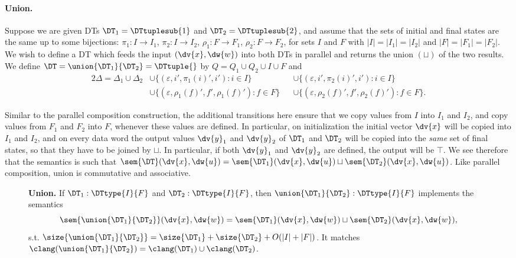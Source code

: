 \paragraph*{Union.}
Suppose we are given DTs $\DT_1 = \DTtuplesub{1}$ and $\DT_2 = \DTtuplesub{2}$, and assume that the sets of initial and final states are the same up to some bijections: $\pi_1: I \to I_1$, $\pi_2: I \to I_2$, $\rho_1: F \to F_1$, $\rho_2: F \to F_2$, for sets $I$ and $F$ with $|I| = |I_1| = |I_2|$ and $|F| = |F_1| = |F_2|$. We wish to define a DT which feeds the input $(\dv{x},\dw{w})$ into both DTs in parallel and returns the union $(\sqcup)$ of the two results.
We define $\DT = \union{\DT_1}{\DT_2} = \DTtuple{}$ by $Q = Q_1 \cup Q_2 \cup I \cup F$ and
\begin{alignat*}{2}
\Delta = \Delta_1 \cup \Delta_2
    &\cup \big\{(\varepsilon, i', \pi_1(i)', i') : i \in I \big\}
    &&\cup \big\{(\varepsilon, i', \pi_2(i)', i') : i \in I \big\} \\
    &\cup \big\{(\varepsilon, \rho_1(f)', f', \rho_1(f)') : f \in F \big\}
    &&\cup \big\{(\varepsilon, \rho_2(f)', f', \rho_2(f)') : f \in F \big\}.
\end{alignat*}

Similar to the parallel composition construction, the additional transitions here ensure that we copy values from $I$ into $I_1$ and $I_2$, and copy values from $F_1$ and $F_2$ into $F$, whenever these values are defined. In particular, on initialization the initial vector $\dv{x}$ will be copied into $I_1$ and $I_2$, and on every data word the output values $\dv{y}_1$ and $\dv{y}_2$ of $\DT_1$ and $\DT_2$ will be copied into the \emph{same} set of final states, so that they have to be joined by $\sqcup$. In particular, if both $\dv{y}_1$ and $\dv{y}_2$ are defined, the output will be $\top$. We see therefore that the semantics is such that $\sem{\DT}(\dv{x},\dw{u}) = \sem{\DT_1}(\dv{x},\dw{u}) \sqcup \sem{\DT_2}(\dv{x},\dw{u})$. Like parallel composition, union is commutative and associative.

\begin{figure}[H]
\begin{dtbox}
\textbf{Union.}
If $\DT_1: \DTtype{I}{F}$ and $\DT_2: \DTtype{I}{F}$,
then $\union{\DT_1}{\DT_2} : \DTtype{I}{F}$
implements the semantics
\[
\sem{\union{\DT_1}{\DT_2}}(\dv{x},\dw{w}) = \sem{\DT_1}(\dv{x},\dw{w}) \sqcup \sem{\DT_2}(\dv{x},\dw{w}),
\]
s.t. $\size{\union{\DT_1}{\DT_2}} = \size{\DT_1} + \size{\DT_2} + O(|I| + |F|)$.
It matches
$\clang(\union{\DT_1}{\DT_2}) = \clang(\DT_1) \cup \clang(\DT_2)$.
\end{dtbox}

\label{dt:fig:union}
\end{figure}

